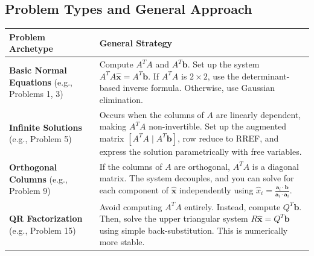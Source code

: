 \documentclass[11pt, letterpaper]{article}
\theoremstyle{definition}
\theoremstyle{remark}
\begin{document}
\subsection{Problem Types and General Approach}
\renewcommand{\arraystretch}{1.5}
\begin{tabularx}{\textwidth}{>{\raggedright\arraybackslash}p{4cm} X}
\toprule
\textbf{Problem Archetype} & \textbf{General Strategy} \\
\midrule
\textbf{Basic Normal Equations} \newline (e.g., Problems 1, 3) & Compute $A^T A$ and $A^T \mathbf{b}$. Set up the system $A^T A \hat{\mathbf{x}} = A^T \mathbf{b}$. If $A^T A$ is $2 \times 2$, use the determinant-based inverse formula. Otherwise, use Gaussian elimination. \\
\addlinespace[4pt]
\textbf{Infinite Solutions} \newline (e.g., Problem 5) & Occurs when the columns of $A$ are linearly dependent, making $A^T A$ non-invertible. Set up the augmented matrix $[A^T A \mid A^T \mathbf{b}]$, row reduce to RREF, and express the solution parametrically with free variables. \\
\addlinespace[4pt]
\textbf{Orthogonal Columns} \newline (e.g., Problem 9) & If the columns of $A$ are orthogonal, $A^T A$ is a diagonal matrix. The system decouples, and you can solve for each component of $\hat{\mathbf{x}}$ independently using $\hat{x}_i = \frac{\mathbf{a}_i \cdot \mathbf{b}}{\mathbf{a}_i \cdot \mathbf{a}_i}$. \\
\addlinespace[4pt]
\textbf{QR Factorization} \newline (e.g., Problem 15) & Avoid computing $A^T A$ entirely. Instead, compute $Q^T \mathbf{b}$. Then, solve the upper triangular system $R\hat{\mathbf{x}} = Q^T \mathbf{b}$ using simple back-substitution. This is numerically more stable. \\
\bottomrule
\end{tabularx}
\end{document}
